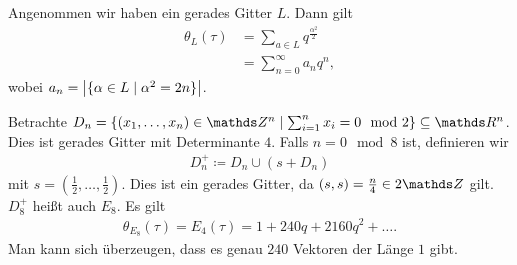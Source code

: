 \begin{bem}
Angenommen wir haben ein gerades Gitter $L$. Dann gilt
\begin{align*}
\theta_L(\tau)&=\sum_{a\in L} q^{\frac{\alpha^2}{2}}\\
&=\sum_{n=0}^\infty a_n q^n,
\end{align*}
wobei $a_n=\left\vert\{\alpha \in L \mid \alpha^2=2n\}\right\vert$.
\end{bem}

\begin{bsp}
Betrachte $D_n=\{(x_1,\dots,x_n)\in \Z^n\mid \sum_{i=1}^nx_i=0\mod 2\}\subseteq \Rn$.
Dies ist gerades Gitter mit Determinante $4$.
Falls $n=0 \mod 8$ ist, definieren wir
\begin{align*}
D_n^+\coloneqq D_n \cup (s+D_n)
\end{align*}
mit $s=(\frac{1}{2},\dots,\frac{1}{2})$.
Dies ist ein gerades Gitter, da $(s,s)=\frac{n}{4} \in 2\Z$ gilt.
$D_8^+$ heißt auch $E_8$. Es gilt
\begin{align*}
\theta_{E_8}(\tau)=E_4(\tau)=1+240q+2160q^2+\dots.
\end{align*}
Man kann sich überzeugen, dass es genau $240$ Vektoren der Länge $1$ gibt.
\end{bsp}